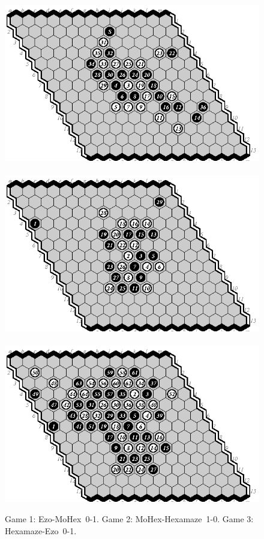 \documentclass{icga}
\def\Eo{\mbox{\sc Ezo}}
\def\Hz{\mbox{\sc Hexamaze}}
\def\Mx{\mbox{\sc MoHex}}
\begin{document}
\begin{figure}[hbp]
\hspace*{-2cm}\
\includegraphics[scale=1.1]{games/pix/13-01-em-0-1.eps}\hspace*{-2cm}\
\includegraphics[scale=1.1]{games/pix/13-02-mh-1-0.eps}\hspace*{-2cm}\
\includegraphics[scale=1.1]{games/pix/13-03-he-0-1.eps}
\caption{Game 1: \Eo-\Mx\ 0-1. Game 2: \Mx-\Hz\ 1-0. Game 3: \Hz-\Eo\ 0-1.}
\end{figure}
\end{document}
